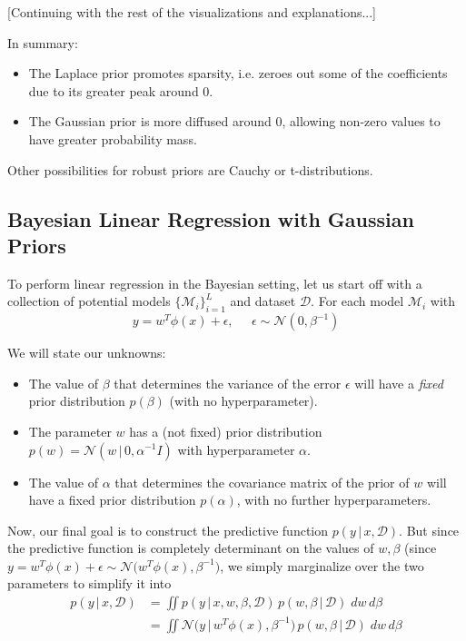   [Continuing with the rest of the visualizations and explanations...]

  In summary:
  \begin{itemize}
    \item The Laplace prior promotes sparsity, i.e. zeroes out some of the coefficients due to its greater peak around $0$.
    \item The Gaussian prior is more diffused around $0$, allowing non-zero values to have greater probability mass.
  \end{itemize}

  Other possibilities for robust priors are Cauchy or t-distributions.

\subsection{Bayesian Linear Regression with Gaussian Priors}

  To perform linear regression in the Bayesian setting, let us start off with a collection of potential models $\{\mathcal{M}_i\}_{i=1}^L$ and dataset $\mathcal{D}$. For each model $\mathcal{M}_i$ with
  \begin{equation}
    y = w^T \phi(x) + \epsilon, \;\;\;\;\; \epsilon \sim \mathcal{N}(0, \beta^{-1})
  \end{equation}

  We will state our unknowns:
  \begin{itemize}
    \item The value of $\beta$ that determines the variance of the error $\epsilon$ will have a \textit{fixed} prior distribution $p(\beta)$ (with no hyperparameter).
    \item The parameter $w$ has a (not fixed) prior distribution $p(w) = \mathcal{N}(w\,|\,0, \alpha^{-1} I)$ with hyperparameter $\alpha$.
    \item The value of $\alpha$ that determines the covariance matrix of the prior of $w$ will have a fixed prior distribution $p(\alpha)$, with no further hyperparameters.
  \end{itemize}

  Now, our final goal is to construct the predictive function $p(y\,|\,x, \mathcal{D})$. But since the predictive function is completely determinant on the values of $w, \beta$ (since $y = w^T \phi(x) + \epsilon \sim \mathcal{N}\big( w^T \phi(x), \beta^{-1}\big)$, we simply marginalize over the two parameters to simplify it into
  \begin{align*}
    p(y\,|\,x, \mathcal{D}) & = \iint p(y\,|\, x, w, \beta, \mathcal{D}) \, p(w, \beta \,|\,\mathcal{D})\; dw\, d\beta \\
    & = \iint \mathcal{N}\big(y\,|\, w^T \phi(x), \beta^{-1}\big) \, p(w, \beta\,|\, \mathcal{D})\; dw\, d\beta
  \end{align*}

